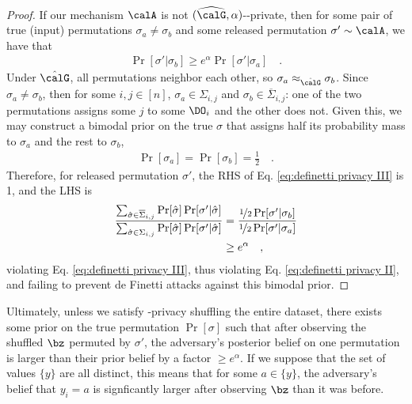 \begin{proof}
If our mechanism $\calA$ is not $(\widehat{\calG}, \alpha)$-\name-private, then for some pair of true (input) permutations $\sigma_a \neq \sigma_b$ and some released permutation $\sigma' \sim \calA$, we have that 
\begin{align*}
    \Pr[\sigma' | \sigma_b] \geq e^\alpha \Pr[\sigma' | \sigma_a]\quad. 
\end{align*}
Under $\hat{\calG}$, all permutations neighbor each other, so $\sigma_a \approx_{\hat{\calG}} \sigma_b$. Since $\sigma_a \neq \sigma_b$, then for some $i,j \in [n]$, $\sigma_a \in \Sigma_{i,j}$ and $\sigma_b \in \overline{\Sigma}_{i,j}$: one of the two permutations assigns some $j$ to some $\DO_i$ and the other does not. Given this, we may construct a bimodal prior on the true $\sigma$ that assigns half its probability mass to $\sigma_a$ and the rest to $\sigma_b$, 
\begin{align*}
    \Pr[\sigma_a] = \Pr[\sigma_b] = \frac{1}{2} \quad .
\end{align*}
Therefore, for released permutation $\sigma'$, the RHS of Eq. \ref{eq:definetti privacy III} is 1, and the LHS is 
\begin{align*}
    \frac{\sum_{\hat{\sigma} \in \overline{\Sigma}_{i,j}} \Pr[\hat{\sigma}] \Pr[\sigma' | \hat{\sigma}] }{
        \sum_{\hat{\sigma} \in {\Sigma_{i,j}}} \Pr[\hat{\sigma}] \Pr[\sigma' | \hat{\sigma}] }
        &= \frac{\nicefrac{1}{2} \Pr[\sigma' | \sigma_b]}{\nicefrac{1}{2} \Pr[\sigma' | \sigma_a]} \\
        &\geq e^\alpha \quad , 
\end{align*}
violating Eq. \ref{eq:definetti privacy III}, thus violating Eq. \ref{eq:definetti privacy II}, and failing to prevent de Finetti attacks against this bimodal prior. 
\end{proof}

Ultimately, unless we satisfy \name-privacy shuffling the entire dataset, there exists some prior on the true permutation $\Pr[\sigma]$ such that after observing the shuffled $\bz$ permuted by $\sigma'$, the adversary's posterior belief on one permutation is larger than their prior belief by a factor $\geq e^\alpha$. If we suppose that the set of values $\{y\}$ are all distinct, this means that for some $a \in \{y\}$, the adversary's belief that $y_i = a$ is signficantly larger after observing $\bz$ than it was before. 


